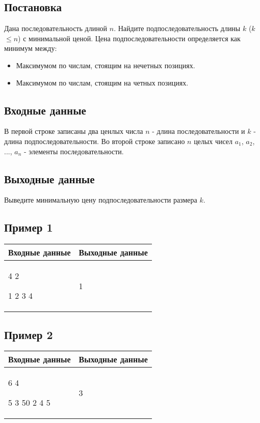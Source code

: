 \documentclass[a4]{article}
\begin{document}
\subsection*{Постановка}
\label{sec:orga2b5149}
Дана последовательность длиной \(n\). Найдите подпоследовательность длины \(k\) (\(k\)$\leq$\(n\)) с минимальной ценой.
\label{sec:orged795e8}
Цена подпоследовательности определяется как минимум между:
\begin{itemize}
    \item Максимумом по числам, стоящим на нечетных позициях.
    \item Максимумом по числам, стоящим на четных позициях.
\end{itemize}
\subsection*{Входные данные}
\label{sec:orgeb4908d}
В первой строке записаны два ценлых числа \(n\) - длина последовательности и \(k\) - длина подпоследовательности.
\label{sec:orged795e8}
Во второй строке записано \(n\) целых чисел \(a_1\), \(a_2\), ..., \(a_n\) - элементы последовательности.

\subsection*{Выходные данные}
\label{sec:orged795e8}
Выведите минимальную цену подпоследовательности размера \(k\).
\subsection*{Пример 1}
\label{sec:org6a26c04}

\begin{table}[H]
\begin{center}
\begin{tabular}{|m{4cm}|m{4cm}|}
\hline
Входные данные & Выходные данные \\ \hline
4 2

1 2 3 4
&
1 
\\ \hline
\end{tabular}
\end{center}
\end{table}

\subsection*{Пример 2}
\label{sec:orge96f7c4}

\begin{table}[H]
\begin{center}
\begin{tabular}{|m{4cm}|m{4cm}|}
\hline
Входные данные & Выходные данные \\ \hline
6 4

5 3 50 2 4 5
&
3
\\ \hline
\end{tabular}
\end{center}
\end{table}
\end{document}
